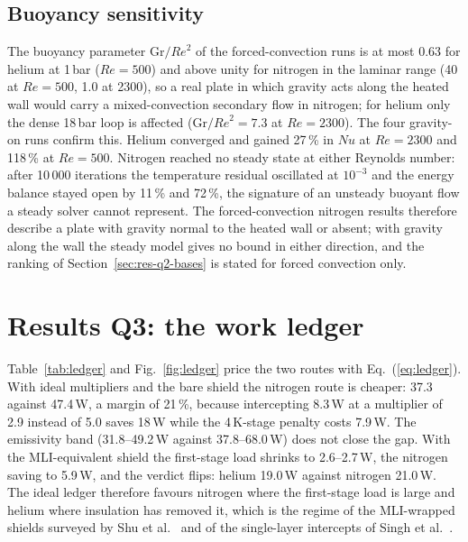 \documentclass[preprint,12pt]{elsarticle}
\renewcommand{\Re}{\mathit{Re}}
\newcommand{\Nu}{\mathit{Nu}}
\begin{document}
\subsection{Buoyancy sensitivity}
\label{sec:res-q2-buoy}

The buoyancy parameter $\mathrm{Gr}/\Re^2$ of the forced-convection runs is at most 0.63 for
helium at 1\,bar ($\Re=500$) and above unity for nitrogen in the laminar range (40 at $\Re=500$,
1.0 at 2300), so a real plate in which gravity acts along the heated wall would carry a
mixed-convection secondary flow in nitrogen; for helium only the dense 18\,bar loop is
affected ($\mathrm{Gr}/\Re^2=7.3$ at $\Re=2300$). The four gravity-on runs confirm this.
Helium converged and gained 27\,\% in $\Nu$ at $\Re=2300$ and 118\,\% at $\Re=500$. Nitrogen
reached no steady state at either Reynolds number: after 10\,000 iterations the temperature
residual oscillated at $10^{-3}$ and the energy balance stayed open by 11\,\% and 72\,\%, the
signature of an unsteady buoyant flow a steady solver cannot represent. The forced-convection
nitrogen results therefore describe a plate with gravity normal to the heated wall or absent;
with gravity along the wall the steady model gives no bound in either direction, and the
ranking of Section~\ref{sec:res-q2-bases} is stated for forced convection only.

\section{Results Q3: the work ledger}
\label{sec:res-q3}

Table~\ref{tab:ledger} and Fig.~\ref{fig:ledger} price the two routes with
Eq.~(\ref{eq:ledger}). With ideal multipliers and the bare shield the nitrogen route is
cheaper: 37.3 against 47.4\,W, a margin of 21\,\%, because intercepting 8.3\,W at a multiplier
of 2.9 instead of 5.0 saves 18\,W while the 4\,K-stage penalty costs 7.9\,W. The emissivity
band (31.8--49.2\,W against 37.8--68.0\,W) does not close the gap. With the MLI-equivalent
shield the first-stage load shrinks to 2.6--2.7\,W, the nitrogen saving to 5.9\,W, and the verdict
flips: helium 19.0\,W against nitrogen 21.0\,W. The ideal ledger therefore favours nitrogen
where the first-stage load is large and helium where insulation has removed it, which is the
regime of the MLI-wrapped shields surveyed by Shu et al.~\cite{Shu2024AdvancedCryostats} and of the
single-layer intercepts of Singh et al.~\cite{Singh2025CryostatThermalProtection}.
\end{document}
